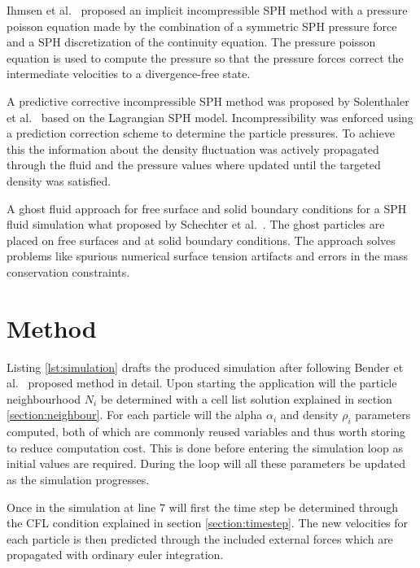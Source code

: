     Ihmsen et al.~\cite{ihmsen2014implicit} proposed an implicit incompressible SPH method with a pressure poisson equation made by the combination of a symmetric SPH pressure force and a SPH discretization of the continuity equation.
    The pressure poisson equation is used to compute the pressure so that the pressure forces correct the intermediate velocities to a divergence-free state.
    
    A predictive corrective incompressible SPH method was proposed by Solenthaler et al.~\cite{solenthaler} based on the Lagrangian SPH model.
    Incompressibility was enforced using a prediction correction scheme to determine the particle pressures.
    To achieve this the information about the density fluctuation was actively propagated through the fluid and the pressure values where updated until the targeted density was satisfied.

    A ghost fluid approach for free surface and solid boundary conditions for a SPH fluid simulation what proposed by Schechter et al.~\cite{ghost}.
    The ghost particles are placed on free surfaces and at solid boundary conditions.
    The approach solves problems like spurious numerical surface tension artifacts and errors in the mass conservation constraints.


\section{Method}

Listing \ref{lst:simulation} drafts the produced simulation after following Bender et al.~\cite{bender} proposed method in detail. Upon starting the application will the particle neighbourhood $N_i$ be determined with a cell list solution explained in section \ref{section:neighbour}. For each particle will the alpha $\alpha_i$ and density $\rho_i$ parameters computed, both of which are commonly reused variables and thus worth storing to reduce computation cost. This is done before entering the simulation loop as initial values are required. During the loop will all these parameters be updated as the simulation progresses.

Once in the simulation at line $7$ will first the time step be determined through the CFL condition explained in section \ref{section:timestep}. The new velocities for each particle is then predicted through the included external forces which are propagated with ordinary euler integration.

